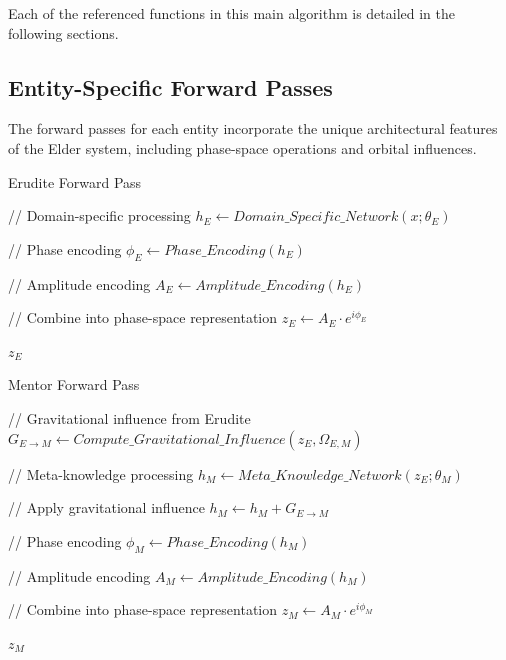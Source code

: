 Each of the referenced functions in this main algorithm is detailed in the following sections.

\subsection{Entity-Specific Forward Passes}

The forward passes for each entity incorporate the unique architectural features of the Elder system, including phase-space operations and orbital influences.

\begin{algorithm}
\caption{Erudite Forward Pass}
\begin{algorithmic}[1]
    \State // Domain-specific processing
    \State $h_E \gets Domain\_Specific\_Network(x; \theta_E)$
    
    \State // Phase encoding
    \State $\phi_E \gets Phase\_Encoding(h_E)$
    
    \State // Amplitude encoding
    \State $A_E \gets Amplitude\_Encoding(h_E)$
    
    \State // Combine into phase-space representation
    \State $z_E \gets A_E \cdot e^{i \phi_E}$
    
    \State \Return $z_E$
\EndFunction
\end{algorithmic}
\end{algorithm}

\begin{algorithm}
\caption{Mentor Forward Pass}
\begin{algorithmic}[1]
    \State // Gravitational influence from Erudite
    \State $G_{E \rightarrow M} \gets Compute\_Gravitational\_Influence(z_E, \Omega_{E,M})$
    
    \State // Meta-knowledge processing
    \State $h_M \gets Meta\_Knowledge\_Network(z_E; \theta_M)$
    
    \State // Apply gravitational influence
    \State $h_M \gets h_M + G_{E \rightarrow M}$
    
    \State // Phase encoding
    \State $\phi_M \gets Phase\_Encoding(h_M)$
    
    \State // Amplitude encoding
    \State $A_M \gets Amplitude\_Encoding(h_M)$
    
    \State // Combine into phase-space representation
    \State $z_M \gets A_M \cdot e^{i \phi_M}$
    
    \State \Return $z_M$
\EndFunction
\end{algorithmic}
\end{algorithm}

